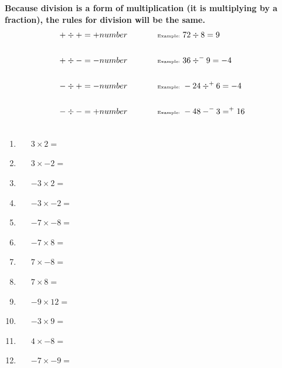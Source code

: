 \documentclass[a4paper,12pt]{article}
\begin{document}
\newpage
\textbf{Because division is a form of multiplication (it is multiplying by a fraction), the rules for division will be the same.}\\
\begin{align*}
+\div +&= + number~~~~~~~~~~~\text{\tiny Example: }72\div 8 =9\\\\
+\div -&= - number~~~~~~~~~~~\text{\tiny Example: } 36\div^{-}9=-4\\\\
-\div +&= - number~~~~~~~~~~~\text{\tiny Example: } -24\div ^{+}6=-4\\\\
-\div -&= + number~~~~~~~~~~~\text{\tiny Example: } -48-^{-}3=^{+}16\\\\
\end{align*}
\begin{tcolorbox}[colback=red!0!white, colframe=gray ,title=\subsubsection{Work out the following sums.}\label{multInt0}]
	\begin{multicols}{3}
		\begin{enumerate}[label=\footnotesize \roman*)]
			\item~~~$3\times2=$
			\item~~~$3\times-2=$
			\item~~~$-3\times2=$
			\item~~~$-3\times-2=$
			\item~~~$-7\times-8=$
			\item~~~$-7\times8=$
			\item~~~$7\times-8=$
			\item~~~$7\times8=$
			\item~~~$-9\times12=$
			\item~~~$-3\times9=$
			\item~~~$4\times-8=$
			\item~~~$-7\times-9=$
		\end{enumerate}
	\end{multicols}
\end{tcolorbox}\vspace{0.75cm}
\end{document}
